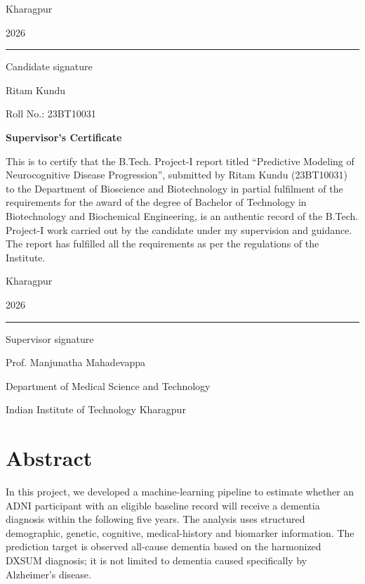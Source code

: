 \documentclass[11pt,a4paper]{article}
\begin{document}
\vspace{24mm}
\noindent\begin{minipage}[t]{.28\linewidth}
\vspace{0pt}
Kharagpur\par 2026
\end{minipage}\hfill
\begin{minipage}[t]{.64\linewidth}
\vspace{0pt}\raggedleft
\rule{58mm}{.4pt}\par
{\small Candidate signature}\par\smallskip
Ritam Kundu\par Roll No.: 23BT10031
\end{minipage}
\clearpage
\thispagestyle{plain}
\vspace*{18mm}
\begin{center}{\Large\bfseries Supervisor's Certificate}\end{center}
\vspace{8mm}
This is to certify that the B.Tech. Project-I report titled ``Predictive Modeling of Neurocognitive Disease Progression'', submitted by Ritam Kundu (23BT10031) to the Department of Bioscience and Biotechnology in partial fulfilment of the requirements for the award of the degree of Bachelor of Technology in Biotechnology and Biochemical Engineering, is an authentic record of the B.Tech. Project-I work carried out by the candidate under my supervision and guidance. The report has fulfilled all the requirements as per the regulations of the Institute.

\vspace{24mm}
\noindent\begin{minipage}[t]{.28\linewidth}
\vspace{0pt}
Kharagpur\par 2026
\end{minipage}\hfill
\begin{minipage}[t]{.64\linewidth}
\vspace{0pt}\raggedleft
\rule{58mm}{.4pt}\par
{\small Supervisor signature}\par\smallskip
Prof. Manjunatha Mahadevappa\par Department of Medical Science and Technology\par Indian Institute of Technology Kharagpur
\end{minipage}
\clearpage
\section*{Abstract}
In this project, we developed a machine-learning pipeline to estimate whether an ADNI participant with an eligible baseline record will receive a dementia diagnosis within the following five years. The analysis uses structured demographic, genetic, cognitive, medical-history and biomarker information. The prediction target is observed all-cause dementia based on the harmonized DXSUM diagnosis; it is not limited to dementia caused specifically by Alzheimer's disease.
\end{document}
